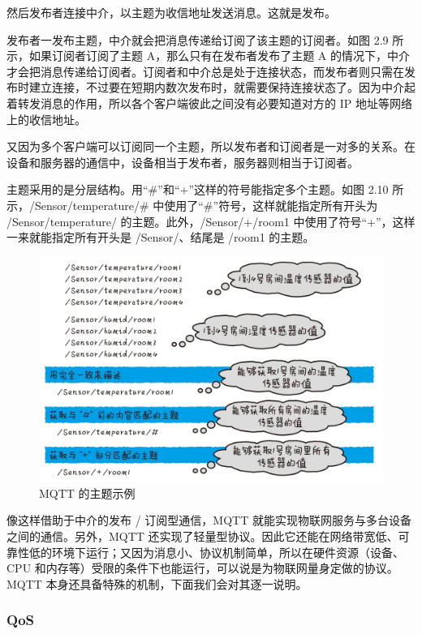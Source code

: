 \documentclass[12pt,UTF8]{ctexbook}
\begin{document}
然后发布者连接中介，以主题为收信地址发送消息。这就是发布。

发布者一发布主题，中介就会把消息传递给订阅了该主题的订阅者。如图 2.9 所示，如果订阅者订阅了主题 A，那么只有在发布者发布了主题 A 的情况下，中介才会把消息传递给订阅者。订阅者和中介总是处于连接状态，而发布者则只需在发布时建立连接，不过要在短期内数次发布时，就需要保持连接状态了。因为中介起着转发消息的作用，所以各个客户端彼此之间没有必要知道对方的 IP 地址等网络上的收信地址。

又因为多个客户端可以订阅同一个主题，所以发布者和订阅者是一对多的关系。在设备和服务器的通信中，设备相当于发布者，服务器则相当于订阅者。

主题采用的是分层结构。用“\#”和“+”这样的符号能指定多个主题。如图 2.10 所示，/Sensor/temperature/\# 中使用了“\#”符号，这样就能指定所有开头为 /Sensor/temperature/ 的主题。此外，/Sensor/+/room1 中使用了符号“+”，这样一来就能指定所有开头是 /Sensor/、结尾是 /room1 的主题。

\begin{figure}[htbp]
	\centering
	\includegraphics[width=1\linewidth]{29}
	\caption{MQTT 的主题示例}
	\label{fig:1}
\end{figure}

像这样借助于中介的发布 / 订阅型通信，MQTT 就能实现物联网服务与多台设备之间的通信。另外，MQTT 还实现了轻量型协议。因此它还能在网络带宽低、可靠性低的环境下运行；又因为消息小、协议机制简单，所以在硬件资源（设备、CPU 和内存等）受限的条件下也能运行，可以说是为物联网量身定做的协议。MQTT 本身还具备特殊的机制，下面我们会对其逐一说明。

\subsubsection{QoS}
\end{document}
